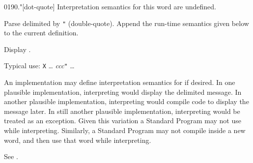 \vspace*{-1.5ex}
\begin{worddef}[.q]{0190}{."}[dot-quote]
\interpret
	Interpretation semantics for this word are undefined.

\compile

	Parse  delimited by \texttt{"} (double-quote).
	Append the run-time semantics given below to the current
	definition.

\runtime
	\stack{}{}

	Display .


	\begin{rationale} %
		Typical use:
			\word{:} \texttt{X} {\ldots}
				 \emph{ccc}\texttt{"} {\ldots}
			\word{;}

		An implementation may define interpretation semantics for
		 if desired. In one plausible implementation,
		interpreting  would display the delimited message.
		In another plausible implementation, interpreting 
		would compile code to display the message later. In still
		another plausible implementation, interpreting  would
		be treated as an exception. Given this variation a Standard
		Program may not use  while interpreting. Similarly,
		a Standard Program may not compile  
		inside a new word, and then use that word while interpreting.
	\end{rationale}

	\begin{testing} %

		See .
	\end{testing}
\end{worddef}

